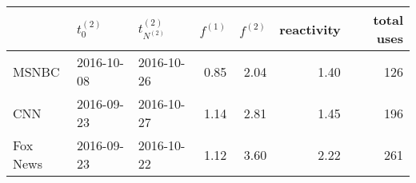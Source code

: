 \begin{tabular}{lllrrrr}
\toprule
{} & $t_0^{(2)}$ & $t^{(2)}_{N^{(2)}}$ & $f^{(1)}$ & $f^{(2)}$ & reactivity & total uses \\
\midrule
MSNBC    &  2016-10-08 &          2016-10-26 &      0.85 &      2.04 &       1.40 &        126 \\
CNN      &  2016-09-23 &          2016-10-27 &      1.14 &      2.81 &       1.45 &        196 \\
Fox News &  2016-09-23 &          2016-10-22 &      1.12 &      3.60 &       2.22 &        261 \\
\bottomrule
\end{tabular}
